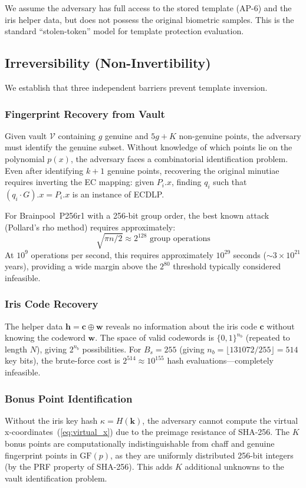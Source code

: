 \documentclass[conference]{IEEEtran}
\newcommand{\GFp}{\mathrm{GF}(p)}
\begin{document}
We assume the adversary has full access to the stored template (AP-6) and the iris helper data, but does not possess the original biometric samples. This is the standard ``stolen-token'' model for template protection evaluation.

\subsection{Irreversibility (Non-Invertibility)}
\label{sec:irreversibility}

We establish that three independent barriers prevent template inversion.

\subsubsection{Fingerprint Recovery from Vault}
Given vault $\mathcal{V}$ containing $g$ genuine and $5g + K$ non-genuine points, the adversary must identify the genuine subset. Without knowledge of which points lie on the polynomial $p(x)$, the adversary faces a combinatorial identification problem. Even after identifying $k+1$ genuine points, recovering the original minutiae requires inverting the EC mapping: given $P_i.x$, finding $q_i$ such that $(q_i \cdot G).x = P_i.x$ is an instance of ECDLP.

For Brainpool~P256r1 with a 256-bit group order, the best known attack (Pollard's rho method) requires approximately:
\begin{equation}
    \sqrt{\pi n / 2} \approx 2^{128} \text{ group operations}
    \label{eq:ecdlp_cost}
\end{equation}
At $10^9$ operations per second, this requires approximately $10^{29}$ seconds ($\sim\! 3 \times 10^{21}$ years), providing a wide margin above the $2^{80}$ threshold typically considered infeasible.

\subsubsection{Iris Code Recovery}
The helper data $\mathbf{h} = \mathbf{c} \oplus \mathbf{w}$ reveals no information about the iris code $\mathbf{c}$ without knowing the codeword $\mathbf{w}$. The space of valid codewords is $\{0,1\}^{n_b}$ (repeated to length $N$), giving $2^{n_b}$ possibilities. For $B_s = 255$ (giving $n_b = \lfloor 131072/255 \rfloor = 514$ key bits), the brute-force cost is $2^{514} \approx 10^{155}$ hash evaluations---completely infeasible.

\subsubsection{Bonus Point Identification}
Without the iris key hash $\kappa = H(\mathbf{k})$, the adversary cannot compute the virtual x-coordinates~(\ref{eq:virtual_x}) due to the preimage resistance of SHA-256. The $K$ bonus points are computationally indistinguishable from chaff and genuine fingerprint points in $\GFp{}$, as they are uniformly distributed 256-bit integers (by the PRF property of SHA-256). This adds $K$ additional unknowns to the vault identification problem.
\end{document}
